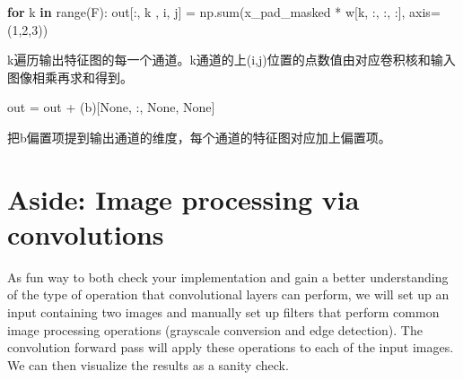 \documentclass[11pt]{article}
\newenvironment{Shaded}{}{}
\newcommand{\KeywordTok}[1]{\textcolor[rgb]{0.00,0.44,0.13}{\textbf{{#1}}}}
\newcommand{\DecValTok}[1]{\textcolor[rgb]{0.25,0.63,0.44}{{#1}}}
\newcommand{\NormalTok}[1]{{#1}}
\newcommand{\VariableTok}[1]{\textcolor[rgb]{0.10,0.09,0.49}{{#1}}}
\newcommand{\ControlFlowTok}[1]{\textcolor[rgb]{0.00,0.44,0.13}{\textbf{{#1}}}}
\newcommand{\OperatorTok}[1]{\textcolor[rgb]{0.40,0.40,0.40}{{#1}}}
\newcommand{\BuiltInTok}[1]{{#1}}
\begin{document}
\begin{Shaded}
\begin{Highlighting}[]
\ControlFlowTok{for}\NormalTok{ k }\KeywordTok{in} \BuiltInTok{range}\NormalTok{(F):}
\NormalTok{    out[:, k , i, j] }\OperatorTok{=}\NormalTok{ np.}\BuiltInTok{sum}\NormalTok{(x_pad_masked }\OperatorTok{*}\NormalTok{ w[k, :, :, :], axis}\OperatorTok{=}\NormalTok{(}\DecValTok{1}\NormalTok{,}\DecValTok{2}\NormalTok{,}\DecValTok{3}\NormalTok{))}
\end{Highlighting}
\end{Shaded}


k遍历输出特征图的每一个通道。k通道的上(i,j)位置的点数值由对应卷积核和输入图像相乘再求和得到。

\begin{Shaded}
\begin{Highlighting}[]
\NormalTok{out }\OperatorTok{=}\NormalTok{ out }\OperatorTok{+}\NormalTok{ (b)[}\VariableTok{None}\NormalTok{, :, }\VariableTok{None}\NormalTok{, }\VariableTok{None}\NormalTok{]}
\end{Highlighting}
\end{Shaded}

 把b偏置项提到输出通道的维度，每个通道的特征图对应加上偏置项。 

    \hypertarget{aside-image-processing-via-convolutions}{%
\section{Aside: Image processing via
convolutions}\label{aside-image-processing-via-convolutions}}

As fun way to both check your implementation and gain a better
understanding of the type of operation that convolutional layers can
perform, we will set up an input containing two images and manually set
up filters that perform common image processing operations (grayscale
conversion and edge detection). The convolution forward pass will apply
these operations to each of the input images. We can then visualize the
results as a sanity check.
\end{document}
